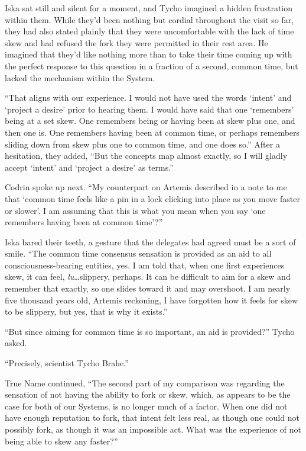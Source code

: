 Iska sat still and silent for a moment, and Tycho imagined a hidden frustration within them. While they'd been nothing but cordial throughout the visit so far, they had also stated plainly that they were uncomfortable with the lack of time skew and had refused the fork they were permitted in their rest area. He imagined that they'd like nothing more than to take their time coming up with the perfect response to this question in a fraction of a second, common time, but lacked the mechanism within the System.

``That aligns with our experience. I would not have used the words `intent' and `project a desire' prior to hearing them. I would have said that one `remembers' being at a set skew. One remembers being or having been at skew plus one, and then one is. One remembers having been at common time, or perhaps remembers sliding down from skew plus one to common time, and one does so.'' After a hesitation, they added, ``But the concepts map almost exactly, so I will gladly accept `intent' and `project a desire' as terms.''

Codrin spoke up next. ``My counterpart on Artemis described in a note to me that `common time feels like a pin in a lock clicking into place as you move faster or slower'. I am assuming that this is what you mean when you say `one remembers having been at common time'?''

Iska bared their teeth, a gesture that the delegates had agreed must be a sort of smile. ``The common time consensus sensation is provided as an aid to all consciousness-bearing entities, yes. I am told that, when one first experiences skew, it can feel, \emph{lu}\ldots slippery, perhaps. It can be difficult to aim for a skew and remember that exactly, so one slides toward it and may overshoot. I am nearly five thousand years old, Artemis reckoning, I have forgotten how it feels for skew to be slippery, but yes, that is why it exists.''

``But since aiming for common time is so important, an aid is provided?'' Tycho asked.

``Precisely, scientist Tycho Brahe.''

True Name continued, ``The second part of my comparison was regarding the sensation of not having the ability to fork or skew, which, as appears to be the case for both of our Systems, is no longer much of a factor. When one did not have enough reputation to fork, that intent felt less real, as though one could not possibly fork, as though it was an impossible act. What was the experience of not being able to skew any faster?''

